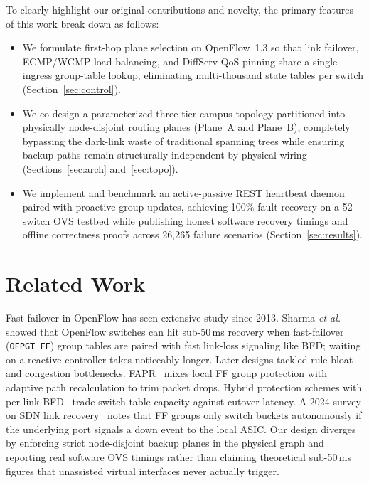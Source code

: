 \documentclass[conference]{IEEEtran}
\begin{document}
To clearly highlight our original contributions and novelty, the primary features of this work break down as follows:
\begin{itemize}
  \item We formulate first-hop plane selection on OpenFlow~1.3 so that link failover, ECMP/WCMP load balancing, and DiffServ QoS pinning share a single ingress group-table lookup, eliminating multi-thousand state tables per switch (Section~\ref{sec:control}).
  \item We co-design a parameterized three-tier campus topology partitioned into physically node-disjoint routing planes (Plane~A and Plane~B), completely bypassing the dark-link waste of traditional spanning trees while ensuring backup paths remain structurally independent by physical wiring (Sections~\ref{sec:arch} and~\ref{sec:topo}).
  \item We implement and benchmark an active-passive REST heartbeat daemon paired with proactive group updates, achieving 100\% fault recovery on a 52-switch OVS testbed while publishing honest software recovery timings and offline correctness proofs across 26{,}265 failure scenarios (Section~\ref{sec:results}).
\end{itemize}

\section{Related Work}\label{sec:related}
Fast failover in OpenFlow has seen extensive study since 2013. Sharma \emph{et al.}~\cite{sharma} showed that OpenFlow switches can hit sub-50\,ms recovery when fast-failover (\texttt{OFPGT\_FF}) group tables are paired with fast link-loss signaling like BFD; waiting on a reactive controller takes noticeably longer. Later designs tackled rule bloat and congestion bottlenecks. FAPR~\cite{fapr} mixes local FF group protection with adaptive path recalculation to trim packet drops. Hybrid protection schemes with per-link BFD~\cite{ijaip} trade switch table capacity against cutover latency. A 2024 survey on SDN link recovery~\cite{survey_lf} notes that FF groups only switch buckets autonomously if the underlying port signals a down event to the local ASIC. Our design diverges by enforcing strict node-disjoint backup planes in the physical graph and reporting real software OVS timings rather than claiming theoretical sub-50\,ms figures that unassisted virtual interfaces never actually trigger.
\end{document}
